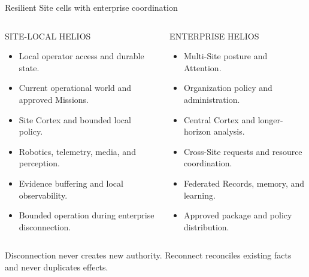 \documentclass[aspectratio=169,10pt]{beamer}
\begin{document}
\begin{frame}{Resilient Site cells with enterprise coordination}
\begin{columns}[T]
\begin{block}{SITE-LOCAL HELIOS}\small\begin{itemize}\item Local operator access and durable state.\item Current operational world and approved Missions.\item Site Cortex and bounded local policy.\item Robotics, telemetry, media, and perception.\item Evidence buffering and local observability.\item Bounded operation during enterprise disconnection.\end{itemize}\end{block}
\begin{block}{ENTERPRISE HELIOS}\small\begin{itemize}\item Multi-Site posture and Attention.\item Organization policy and administration.\item Central Cortex and longer-horizon analysis.\item Cross-Site requests and resource coordination.\item Federated Records, memory, and learning.\item Approved package and policy distribution.\end{itemize}\end{block}
\end{columns}
\vspace{2mm}
\centering
{}
\vfill{\color{amber}\small Disconnection never creates new authority. Reconnect reconciles existing facts and never duplicates effects.}
\end{frame}


\end{document}
